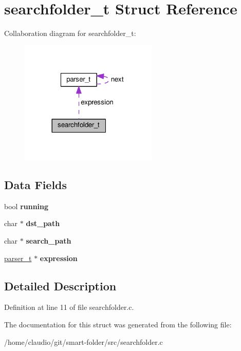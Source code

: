 \hypertarget{structsearchfolder__t}{}\section{searchfolder\+\_\+t Struct Reference}
\label{structsearchfolder__t}


Collaboration diagram for searchfolder\+\_\+t\+:\nopagebreak
\begin{figure}[H]
\begin{center}
\leavevmode
\includegraphics[width=185pt]{structsearchfolder__t__coll__graph}
\end{center}
\end{figure}
\subsection*{Data Fields}
\begin{DoxyCompactItemize}
\item 
bool {\bfseries running}\hypertarget{structsearchfolder__t_a36f7b6be7108281af77939ceaec42fd6}{}\label{structsearchfolder__t_a36f7b6be7108281af77939ceaec42fd6}

\item 
char $\ast$ {\bfseries dst\+\_\+path}\hypertarget{structsearchfolder__t_a74a7cec2bc63610109c58ef392d14e27}{}\label{structsearchfolder__t_a74a7cec2bc63610109c58ef392d14e27}

\item 
char $\ast$ {\bfseries search\+\_\+path}\hypertarget{structsearchfolder__t_a614ce96a64fa528698e05ce10070efe9}{}\label{structsearchfolder__t_a614ce96a64fa528698e05ce10070efe9}

\item 
\hyperlink{structparser__t}{parser\+\_\+t} $\ast$ {\bfseries expression}\hypertarget{structsearchfolder__t_a37eed245f4d8beb45412f8ba904643b2}{}\label{structsearchfolder__t_a37eed245f4d8beb45412f8ba904643b2}

\end{DoxyCompactItemize}


\subsection{Detailed Description}


Definition at line 11 of file searchfolder.\+c.



The documentation for this struct was generated from the following file\+:\begin{DoxyCompactItemize}
\item 
/home/claudio/git/smart-\/folder/src/searchfolder.\+c\end{DoxyCompactItemize}
